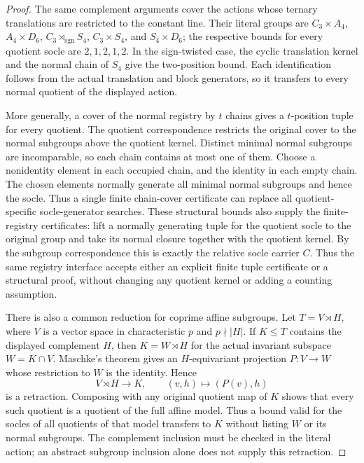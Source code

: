 \begin{proof}
The same complement arguments cover the actions whose ternary
translations are restricted to the constant line. Their literal groups are
$C_3\times A_4$, $A_4\times D_6$, $C_3\rtimes_{\mathrm{sgn}}S_4$,
$C_3\times S_4$, and $S_4\times D_6$; the respective bounds for every
quotient socle are $2,1,2,1,2$. In the sign-twisted case, the cyclic
translation kernel and the normal chain of $S_4$ give the two-position
bound. Each identification follows from the actual translation and block
generators, so it transfers to every normal quotient of the displayed action.

More generally, a cover of the normal registry by $t$ chains gives a
$t$-position tuple for every quotient. The quotient correspondence
restricts the original cover to the normal subgroups above the quotient
kernel. Distinct minimal
normal subgroups are incomparable, so each chain contains at most one of
them. Choose a nonidentity element in each occupied chain, and the identity
in each empty chain. The chosen elements normally generate all minimal
normal subgroups and hence the socle. Thus a single finite chain-cover
certificate can replace all quotient-specific socle-generator searches.
These structural bounds also supply the finite-registry certificates:
lift a normally generating tuple for the quotient socle to the original
group and take its normal closure together with the quotient kernel.
By the subgroup correspondence this is exactly the relative socle carrier
$C$. Thus the same registry interface accepts either an explicit finite
tuple certificate or a structural proof, without changing any quotient
kernel or adding a counting assumption.


There is also a common reduction for coprime affine subgroups. Let
$T=V\rtimes H$, where $V$ is a vector space in characteristic $p$ and
$p\nmid |H|$. If $K\leq T$ contains the displayed complement $H$, then
$K=W\rtimes H$ for the actual invariant subspace $W=K\cap V$.
Maschke's theorem gives an $H$-equivariant projection $P:V\to W$
whose restriction to $W$ is the identity. Hence
\[
 V\rtimes H\longrightarrow K,\qquad (v,h)\longmapsto(P(v),h)
\]
is a retraction. Composing with any original quotient map of $K$
shows that every such quotient is a quotient of the full affine model.
Thus a bound valid for the socles of all quotients of that model transfers
to $K$ without listing $W$ or its normal subgroups. The complement
inclusion must be checked in the literal action; an abstract subgroup
inclusion alone does not supply this retraction.


\end{proof}
